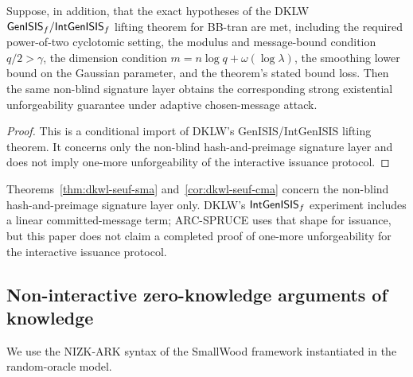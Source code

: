 \begin{corollary}\label{cor:dkwl-seuf-cma}
Suppose, in addition, that the exact hypotheses of the DKLW \(\mathsf{GenISIS}_f/\mathsf{IntGenISIS}_f\) lifting theorem for
BB-tran are met, including the required power-of-two cyclotomic setting, the modulus and message-bound condition
\(q/2>\gamma\), the dimension condition \(m=n\log q+\omega(\log\lambda)\), the smoothing lower bound on the
Gaussian parameter, and the theorem's stated bound loss.  Then the same non-blind signature layer obtains the
corresponding strong existential unforgeability guarantee under adaptive chosen-message attack.
\end{corollary}

\begin{proof}
This is a conditional import of DKLW's GenISIS/IntGenISIS lifting theorem.  It concerns only the non-blind
hash-and-preimage signature layer and does not imply one-more unforgeability of the interactive issuance protocol.
\end{proof}

\begin{remark}\label{rem:dkwl-scope}
Theorems~\ref{thm:dkwl-seuf-sma} and~\ref{cor:dkwl-seuf-cma} concern the non-blind hash-and-preimage signature
layer only.  DKLW's \(\mathsf{IntGenISIS}_f\) experiment includes a linear committed-message term; ARC-SPRUCE uses that
shape for issuance, but this paper does not claim a completed proof of one-more unforgeability for the interactive
issuance protocol.
\end{remark}

\subsection{Non-interactive zero-knowledge arguments of knowledge}
\label{subsec:prelim-nizk}
\label{subsec:nizk-ark}
We use the NIZK-ARK syntax of the SmallWood framework instantiated in the random-oracle model.

